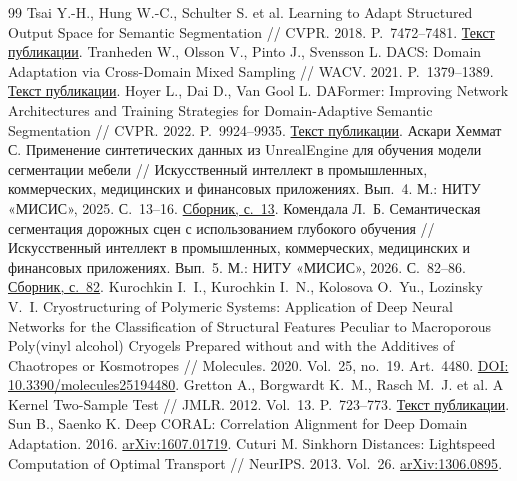 \begin{thebibliography}{99}
 Tsai Y.-H., Hung W.-C., Schulter S. et al. Learning to Adapt Structured Output Space for Semantic Segmentation // CVPR. 2018. P.~7472--7481. \href{https://openaccess.thecvf.com/content_cvpr_2018/html/Tsai_Learning_to_Adapt_CVPR_2018_paper.html}{Текст публикации}.
 Tranheden W., Olsson V., Pinto J., Svensson L. DACS: Domain Adaptation via Cross-Domain Mixed Sampling // WACV. 2021. P.~1379--1389. \href{https://openaccess.thecvf.com/content/WACV2021/html/Tranheden_DACS_Domain_Adaptation_via_Cross-Domain_Mixed_Sampling_WACV_2021_paper.html}{Текст публикации}.
 Hoyer L., Dai D., Van Gool L. DAFormer: Improving Network Architectures and Training Strategies for Domain-Adaptive Semantic Segmentation // CVPR. 2022. P.~9924--9935. \href{https://openaccess.thecvf.com/content/CVPR2022/html/Hoyer_DAFormer_Improving_Network_Architectures_and_Training_Strategies_for_Domain-Adaptive_Semantic_CVPR_2022_paper.html}{Текст публикации}.
 Аскари Хеммат С. Применение синтетических данных из UnrealEngine для обучения модели сегментации мебели // Искусственный интеллект в промышленных, коммерческих, медицинских и финансовых приложениях. Вып.~4. М.: НИТУ «МИСИС», 2025. С.~13--16. \href{https://sadekov.su/Articles/kik_2025_1.pdf#page=14}{Сборник, с.~13}.
 Комендала Л.~Б. Семантическая сегментация дорожных сцен с использованием глубокого обучения // Искусственный интеллект в промышленных, коммерческих, медицинских и финансовых приложениях. Вып.~5. М.: НИТУ «МИСИС», 2026. С.~82--86. \href{https://sadekov.su/Articles/kik_2025_2.pdf#page=83}{Сборник, с.~82}.
 Kurochkin I.~I., Kurochkin I.~N., Kolosova O.~Yu., Lozinsky V.~I. Cryostructuring of Polymeric Systems: Application of Deep Neural Networks for the Classification of Structural Features Peculiar to Macroporous Poly(vinyl alcohol) Cryogels Prepared without and with the Additives of Chaotropes or Kosmotropes // Molecules. 2020. Vol.~25, no.~19. Art.~4480. \href{https://doi.org/10.3390/molecules25194480}{DOI: 10.3390/molecules25194480}.
 Gretton A., Borgwardt K.~M., Rasch M.~J. et al. A Kernel Two-Sample Test // JMLR. 2012. Vol.~13. P.~723--773. \href{https://www.jmlr.org/papers/v13/gretton12a.html}{Текст публикации}.
 Sun B., Saenko K. Deep CORAL: Correlation Alignment for Deep Domain Adaptation. 2016. \href{https://arxiv.org/abs/1607.01719}{arXiv:1607.01719}.
 Cuturi M. Sinkhorn Distances: Lightspeed Computation of Optimal Transport // NeurIPS. 2013. Vol.~26. \href{https://arxiv.org/abs/1306.0895}{arXiv:1306.0895}.

\end{thebibliography}
